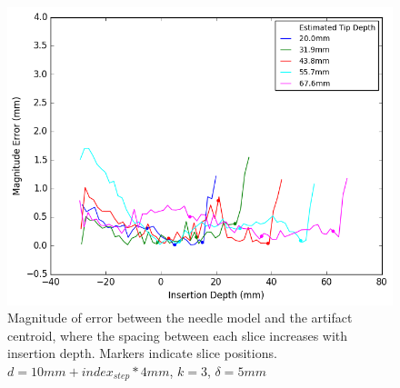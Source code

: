 \begin{figure}[h]
\includegraphics[width=1.0\textwidth]{Fig/chap5/error_curve_3_var.png}
\caption{Magnitude of error between the needle model and the artifact centroid, where the spacing between each slice increases with insertion depth. Markers indicate slice positions. $d=10mm + index_{step}*4mm$, $k=3$, $\delta=5mm$ }
\label{fig:curve_errors_variable_spacing}
\end{figure}


